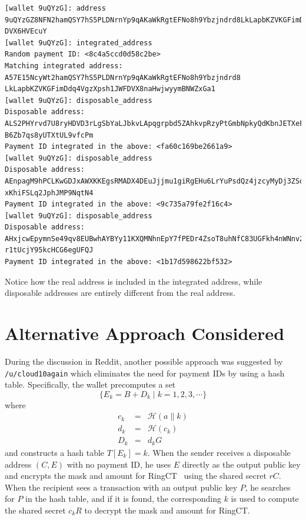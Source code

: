 \documentclass[12pt,english]{mrl}
\theoremstyle{definition}
\numberwithin{equation}{section}
\numberwithin{figure}{section}
\numberwithin{equation}{section}
\numberwithin{equation}{section}
\numberwithin{figure}{section}
\begin{document}
\lstset{columns=fullflexible,frame=single,basicstyle=\ttfamily\scriptsize}
\begin{lstlisting}
[wallet 9uQYzG]: address
9uQYzGZ8NFN2hamQSY7hS5PLDNrnYp9qAKaWkRgtEFNo8h9Ybzjndrd8LkLapbKZVKGFimDdq4VgzXpsh1JWF
DVX6HVEcuY
[wallet 9uQYzG]: integrated_address
Random payment ID: <8c4a5ccd0d58c2be>
Matching integrated address: A57E15NcyWt2hamQSY7hS5PLDNrnYp9qAKaWkRgtEFNo8h9Ybzjndrd8
LkLapbKZVKGFimDdq4VgzXpsh1JWFDVX8naHwjwyymBNWZxGa1
[wallet 9uQYzG]: disposable_address
Disposable address: 
ALS2PHYrvd7U8ryHDVD3rLgSbYaLJbkvLApqgrpbd5ZAhkvpRzyPtGmbNpkyQdKbnJETXeFRYqGQCUJroq3Rg
B6Zb7qs8yUTXtUL9vfcPm
Payment ID integrated in the above: <fa60c169be2661a9>
[wallet 9uQYzG]: disposable_address
Disposable address: 
AEnpagM9hPCLKwGDJxAWXKKEgsRMADX4DEuJjjmu1giRgEHu6LrYuPsdQz4jzcyMyDj3ZSqoMtTB6YkHKt2gN
xKhiFSLq2JphJMP9NqtN4
Payment ID integrated in the above: <9c735a79fe2f16c4>
[wallet 9uQYzG]: disposable_address
Disposable address: 
AHxjcwEpymnSe49qv8EUBwhAYBYy11KXQMNhnEpY7fPEDr4ZsoT8uhNfC83UGFkh4nWNnv2XRkjUcFsFMM1cC
r1tUcjY95kcHCG6egUFQJ
Payment ID integrated in the above: <1b17d598622bf532>
\end{lstlisting}

Notice how the real address is included in the integrated address, while disposable addresses are entirely different from the real address.

\section{Alternative Approach Considered}\label{alternativeApproachConsidered}

During the discussion in Reddit, another possible approach was suggested by \\ \texttt{/u/cloud10again} which eliminates the need for payment IDs by using a hash table. Specifically, the wallet precomputes a set 
\[
\{ E_k =  B + D_k \mid k=1,2,3,\cdots \}
\]
where
\begin{eqnarray*}
c_k &=& \mathcal{H}(a \| k)\\
d_k &=& \mathcal{H}(c_k)\\
D_k &=& d_k G
\end{eqnarray*}
and constructs a hash table $T[E_k]=k$. When the sender receives a disposable address $(C,E)$ with no payment ID, he uses $E$ directly as the output public key and encrypts the mask and amount for RingCT~\cite{mrl5} using the shared secret $rC$. When the recipient sees a transaction with an output public key $P$, he searches for $P$ in the hash table, and if it is found, the corresponding $k$ is used to compute the shared secret $c_k R$ to decrypt the mask and amount for RingCT.
\end{document}
